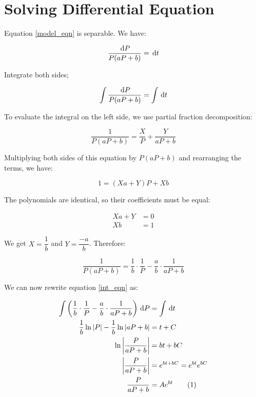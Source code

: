 \documentclass[12pt]{article}
\newcommand{\abs}[1]{\left | #1 \right |}
\newcommand\numberthis{\addtocounter{equation}{1}\tag{\theequation}}
\begin{document}
\section*{Solving Differential Equation}

Equation \ref{model_eqn} is separable. We have:

\begin{equation}
\frac{\dl{P}}{P(aP + b)} = \dl{t}
\end{equation}

Integrate both sides;

\begin{equation} \label{int_eqn}
\int \frac{\dl{P}}{P(aP + b)} = \int \dl{t}
\end{equation}

To evaluate the integral on the left side, we use partial fraction decomposition:

\begin{equation*}
\frac{1}{P(aP + b)} = \frac{X}{P} + \frac{Y}{aP + b}
\end{equation*}

Multiplying both sides of this equation by $P(aP + b)$ and rearranging the terms, we have:

\begin{equation*}
1 = (Xa + Y)P + Xb
\end{equation*}

The polynomials are identical, so their coefficients must be equal:

\begin{align*}
Xa + Y &= 0 \\
Xb &= 1
\end{align*}

We get $X = \dfrac{1}{b}$ and $Y = \dfrac{-a}{b}$. Therefore:

\begin{equation*}
\frac{1}{P(aP + b)} = \frac{1}{b} \cdot \frac{1}{P} - \frac{a}{b} \cdot \frac{1}{aP + b}
\end{equation*}

We can now rewrite equation \ref{int_eqn} as:

\begin{align*}
\int \left ( \frac{1}{b} \cdot \frac{1}{P} - \frac{a}{b} \cdot \frac{1}{aP + b} \right ) \dl{P} &= \int \dl{t} \\
\frac{1}{b} \ln \abs{P} - \frac{1}{b} \ln \abs{aP + b} &= t + C \\
\ln \abs{\frac{P}{aP + b}} &= bt + bC \\
\abs{\frac{P}{aP + b}} &= e^{bt + bC} = e^{bt}e^{bC} \\
\frac{P}{aP + b} &= Ae^{bt} \numberthis \label{int2_eqn}
\end{align*}
\end{document}
